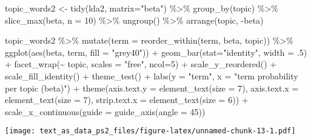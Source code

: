 \documentclass[
]{article}
\newenvironment{Shaded}{\begin{snugshade}}{\end{snugshade}}
\newcommand{\AttributeTok}[1]{\textcolor[rgb]{0.77,0.63,0.00}{#1}}
\newcommand{\DecValTok}[1]{\textcolor[rgb]{0.00,0.00,0.81}{#1}}
\newcommand{\FunctionTok}[1]{\textcolor[rgb]{0.00,0.00,0.00}{#1}}
\newcommand{\NormalTok}[1]{#1}
\newcommand{\OtherTok}[1]{\textcolor[rgb]{0.56,0.35,0.01}{#1}}
\newcommand{\SpecialCharTok}[1]{\textcolor[rgb]{0.00,0.00,0.00}{#1}}
\newcommand{\StringTok}[1]{\textcolor[rgb]{0.31,0.60,0.02}{#1}}
\begin{document}
\begin{Shaded}
\begin{Highlighting}[]
\NormalTok{topic\_words2 }\OtherTok{\textless{}{-}} \FunctionTok{tidy}\NormalTok{(lda2, }\AttributeTok{matrix=}\StringTok{"beta"}\NormalTok{) }\SpecialCharTok{\%\textgreater{}\%}
  \FunctionTok{group\_by}\NormalTok{(topic) }\SpecialCharTok{\%\textgreater{}\%}
  \FunctionTok{slice\_max}\NormalTok{(beta, }\AttributeTok{n =} \DecValTok{10}\NormalTok{) }\SpecialCharTok{\%\textgreater{}\%} 
  \FunctionTok{ungroup}\NormalTok{() }\SpecialCharTok{\%\textgreater{}\%}
  \FunctionTok{arrange}\NormalTok{(topic, }\SpecialCharTok{{-}}\NormalTok{beta)}

\NormalTok{topic\_words2 }\SpecialCharTok{\%\textgreater{}\%}
  \FunctionTok{mutate}\NormalTok{(}\AttributeTok{term =} \FunctionTok{reorder\_within}\NormalTok{(term, beta, topic)) }\SpecialCharTok{\%\textgreater{}\%}
  \FunctionTok{ggplot}\NormalTok{(}\FunctionTok{aes}\NormalTok{(beta, term, }\AttributeTok{fill =} \StringTok{"grey40"}\NormalTok{)) }\SpecialCharTok{+}
  \FunctionTok{geom\_bar}\NormalTok{(}\AttributeTok{stat=}\StringTok{"identity"}\NormalTok{, }\AttributeTok{width =}\NormalTok{ .}\DecValTok{5}\NormalTok{) }\SpecialCharTok{+}
  \FunctionTok{facet\_wrap}\NormalTok{(}\SpecialCharTok{\textasciitilde{}}\NormalTok{ topic, }\AttributeTok{scales =} \StringTok{"free"}\NormalTok{, }\AttributeTok{ncol=}\DecValTok{5}\NormalTok{) }\SpecialCharTok{+} 
  \FunctionTok{scale\_y\_reordered}\NormalTok{() }\SpecialCharTok{+}
  \FunctionTok{scale\_fill\_identity}\NormalTok{() }\SpecialCharTok{+}
  \FunctionTok{theme\_test}\NormalTok{() }\SpecialCharTok{+}
  \FunctionTok{labs}\NormalTok{(}\AttributeTok{y =} \StringTok{"term"}\NormalTok{, }\AttributeTok{x =} \StringTok{"term probability per topic (beta)"}\NormalTok{) }\SpecialCharTok{+}
  \FunctionTok{theme}\NormalTok{(}\AttributeTok{axis.text.y =} \FunctionTok{element\_text}\NormalTok{(}\AttributeTok{size =} \DecValTok{7}\NormalTok{),}
        \AttributeTok{axis.text.x =} \FunctionTok{element\_text}\NormalTok{(}\AttributeTok{size =} \DecValTok{7}\NormalTok{),}
        \AttributeTok{strip.text.x =} \FunctionTok{element\_text}\NormalTok{(}\AttributeTok{size =} \DecValTok{6}\NormalTok{)) }\SpecialCharTok{+}
  \FunctionTok{scale\_x\_continuous}\NormalTok{(}\AttributeTok{guide =} \FunctionTok{guide\_axis}\NormalTok{(}\AttributeTok{angle =} \DecValTok{45}\NormalTok{))}
\end{Highlighting}
\end{Shaded}

\texttt{[image: text\_as\_data\_ps2\_files/figure-latex/unnamed-chunk-13-1.pdf]}
\end{document}
